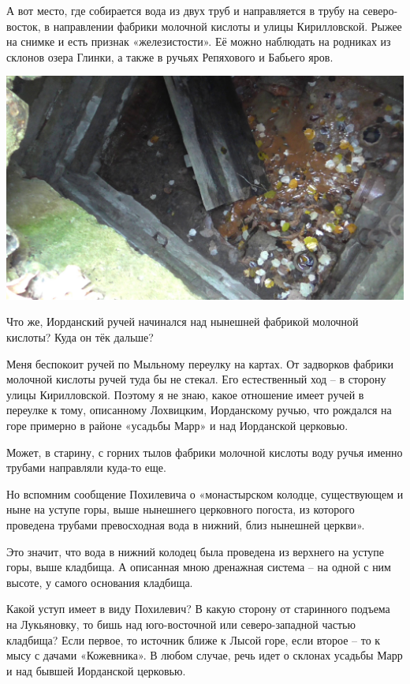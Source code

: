 А вот место, где собирается вода из двух труб и направляется в трубу на северо-восток, в направлении фабрики молочной кислоты и улицы Кирилловской. Рыжее на снимке и есть признак «железистости». Её можно наблюдать на родниках из склонов озера Глинки, а также в ручьях Репяхового и Бабьего яров.

\begin{center}
\includegraphics[width=\linewidth]{chast-kirvys/iordanruch/s_vlcsnap-2014-05-16-20h10m19s241.jpg}
\end{center}

Что же, Иорданский ручей начинался над нынешней фабрикой молочной кислоты? Куда он тёк дальше?

Меня беспокоит ручей по Мыльному переулку на картах. От задворков фабрики молочной кислоты ручей туда бы не стекал. Его естественный ход – в сторону улицы Кирилловской. Поэтому я не знаю, какое отношение имеет ручей в переулке к тому, описанному Лохвицким, Иорданскому ручью, что рождался на горе примерно в районе «усадьбы Марр» и над Иорданской церковью. 

Может, в старину, с горних тылов фабрики молочной кислоты воду ручья именно трубами направляли куда-то еще.

Но вспомним сообщение Похилевича о «монастырском колодце, существующем и ныне на уступе горы, выше нынешнего церковного погоста, из которого проведена трубами превосходная вода в нижний, близ нынешней церкви».

Это значит, что вода в нижний колодец была проведена из верхнего на уступе горы, выше кладбища. А описанная мною дренажная система – на одной с ним высоте, у самого основания кладбища.

Какой уступ имеет в виду Похилевич? В какую сторону от старинного подъема на Лукьяновку, то бишь над юго-восточной или северо-западной частью кладбища? Если первое, то источник ближе к Лысой горе, если второе – то к мысу с дачами «Кожевника». В любом случае, речь идет о склонах усадьбы Марр и над бывшей Иорданской церковью.

